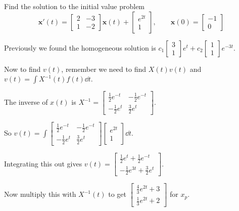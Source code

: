 \documentclass[../diffeq.tex]{subfiles}
\begin{document}
\begin{example}
    Find the solution to the initial value problem 
    \[ \textbf{x}'(t)=\begin{bmatrix}
        2 & -3 \\
        1 & -2 
    \end{bmatrix}\textbf{x}(t)+\begin{bmatrix}
        e^{2t}\\ 1
    \end{bmatrix}, \qquad \textbf{x}(0)=\begin{bmatrix}
        -1 \\ 0
    \end{bmatrix}\]

    Previously we found the homogeneous solution is $c_1\begin{bmatrix}
        3\\1
    \end{bmatrix}e^t+c_2\begin{bmatrix}
        1\\1
    \end{bmatrix}e^{-3t}$.

    Now to find $v(t)$, remember we need to find $X(t)v(t)$ and $v(t)=\int X^{-1}(t)f(t)\dd t$.

    The inverse of $x(t)$ is $X^{-1}=\begin{bmatrix}
        \frac{1}{2}e^{-t} & -\frac{1}{2}e^{-t}\\
        -\frac{1}{2}e^t & \frac{3}{2}e^t
    \end{bmatrix}$.

    So $v(t)=\int \begin{bmatrix}
        \frac{1}{2}e^{-t} & -\frac{1}{2}e^{-t}\\
        -\frac{1}{2}e^{t} & \frac{3}{2}e^t
    \end{bmatrix}\begin{bmatrix}
        e^{2t}\\1
    \end{bmatrix}\dd t$.

    Integrating this out gives $v(t)=\begin{bmatrix}
        \frac{1}{2}e^t+\frac{1}{2}e^{-t}\\
        -\frac{1}{2}e^{3t}+\frac{3}{2}e^t
    \end{bmatrix}$.

    Now multiply this with $X^{-1}(t)$ to get $\begin{bmatrix}
        \frac{4}{3}e^{2t}+3\\
        \frac{1}{3}e^{2t}+2
    \end{bmatrix}$ for $x_p$.


\end{example}
\end{document}
